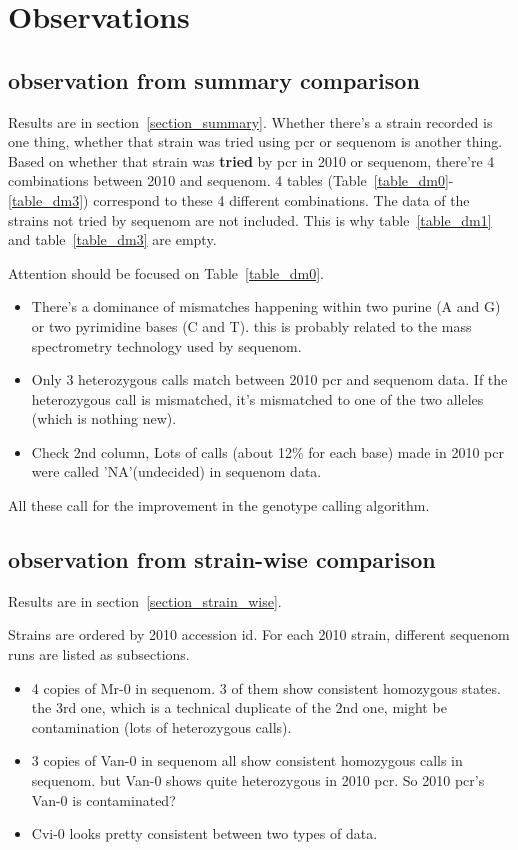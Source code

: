 \documentclass[a4paper,10pt]{article}
\begin{document}
\section{Observations}
\subsection{observation from summary comparison}
Results are in section~\ref{section_summary}. Whether there's a strain recorded is one thing, whether that strain was tried using pcr or sequenom is another thing. Based on whether that strain was \textbf{tried} by pcr in 2010 or sequenom, there're 4 combinations between 2010 and sequenom. 4 tables (Table~\ref{table_dm0}-\ref{table_dm3}) correspond to these 4 different combinations. The data of the strains not tried by sequenom are not included. This is why table~\ref{table_dm1} and table~\ref{table_dm3} are empty.

Attention should be focused on Table~\ref{table_dm0}.
\begin{itemize}
 \item There's a dominance of mismatches happening within two purine (A and G) or two pyrimidine bases (C and T). this is probably related to the mass spectrometry technology used by sequenom.
\item Only 3 heterozygous calls match between 2010 pcr and sequenom data. If the heterozygous call is mismatched, it's mismatched to one of the two alleles (which is nothing new).
\item Check 2nd column, Lots of calls (about 12\% for each base) made in 2010 pcr were called 'NA'(undecided) in sequenom data.
\end{itemize}

All these call for the improvement in the genotype calling algorithm.

\subsection{observation from strain-wise comparison}
Results are in section~\ref{section_strain_wise}.

Strains are ordered by 2010 accession id. For each 2010 strain, different sequenom runs are listed as subsections.

\begin{itemize}
 \item 4 copies of Mr-0 in sequenom. 3 of them show consistent homozygous states. the 3rd one, which is a technical duplicate of the 2nd one, might be contamination (lots of heterozygous calls).
\item 3 copies of Van-0 in sequenom all show consistent homozygous calls in sequenom. but Van-0 shows quite heterozygous in 2010 pcr. So 2010 pcr's Van-0 is contaminated?
\item Cvi-0 looks pretty consistent between two types of data.
\end{itemize}
\end{document}
